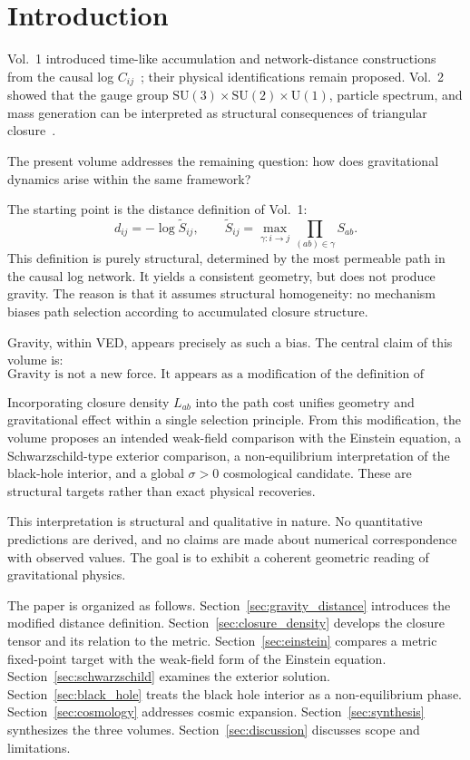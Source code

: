 \section{Introduction}

Vol.~1 introduced time-like accumulation and network-distance constructions
from the causal log $C_{ij}$~\cite{VED_vol1}; their physical identifications
remain proposed.
Vol.~2 showed that the gauge group
$\mathrm{SU}(3)\times\mathrm{SU}(2)\times\mathrm{U}(1)$,
particle spectrum, and mass generation
can be interpreted as structural consequences of triangular closure~\cite{VED_vol2}.

The present volume addresses the remaining question:
how does gravitational dynamics arise within the same framework?

The starting point is the distance definition of Vol.~1:
\begin{equation}
  d_{ij} = -\log \tilde{S}_{ij},
  \qquad
  \tilde{S}_{ij} = \max_{\gamma: i\to j} \prod_{(ab)\in\gamma} S_{ab}.
\end{equation}
This definition is purely structural, determined by the most permeable path
in the causal log network.
It yields a consistent geometry, but does not produce gravity.
The reason is that it assumes structural homogeneity:
no mechanism biases path selection according to accumulated closure structure.

Gravity, within VED, appears precisely as such a bias.
The central claim of this volume is:
\begin{equation}
  \boxed{
    \text{Gravity is not a new force.
    It appears as a modification of the definition of distance.}
  }
\end{equation}

Incorporating closure density $L_{ab}$ into the path cost unifies geometry
and gravitational effect within a single selection principle.
From this modification, the volume proposes an intended weak-field comparison
with the Einstein equation, a Schwarzschild-type exterior comparison, a
non-equilibrium interpretation of the black-hole interior, and a global
$\sigma>0$ cosmological candidate.  These are structural targets rather than
exact physical recoveries.

This interpretation is structural and qualitative in nature.
No quantitative predictions are derived, and no claims are made about
numerical correspondence with observed values.
The goal is to exhibit a coherent geometric reading of gravitational physics.

The paper is organized as follows.
Section~\ref{sec:gravity_distance} introduces the modified distance definition.
Section~\ref{sec:closure_density} develops the closure tensor and its relation
to the metric.
Section~\ref{sec:einstein} compares a metric fixed-point target with the
weak-field form of the Einstein equation.
Section~\ref{sec:schwarzschild} examines the exterior solution.
Section~\ref{sec:black_hole} treats the black hole interior as a non-equilibrium phase.
Section~\ref{sec:cosmology} addresses cosmic expansion.
Section~\ref{sec:synthesis} synthesizes the three volumes.
Section~\ref{sec:discussion} discusses scope and limitations.
